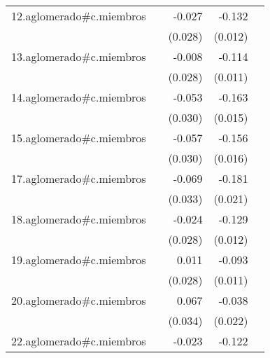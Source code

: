 {\begin{longtable}{l*{4}{D{.}{.}{-1}}}
\addlinespace
12.aglomerado#c.miembros&                     &      -0.027         &      -0.132\sym{***}&                     \\
            &                     &     (0.028)         &     (0.012)         &                     \\
\addlinespace
13.aglomerado#c.miembros&                     &      -0.008         &      -0.114\sym{***}&                     \\
            &                     &     (0.028)         &     (0.011)         &                     \\
\addlinespace
14.aglomerado#c.miembros&                     &      -0.053         &      -0.163\sym{***}&                     \\
            &                     &     (0.030)         &     (0.015)         &                     \\
\addlinespace
15.aglomerado#c.miembros&                     &      -0.057         &      -0.156\sym{***}&                     \\
            &                     &     (0.030)         &     (0.016)         &                     \\
\addlinespace
17.aglomerado#c.miembros&                     &      -0.069\sym{*}  &      -0.181\sym{***}&                     \\
            &                     &     (0.033)         &     (0.021)         &                     \\
\addlinespace
18.aglomerado#c.miembros&                     &      -0.024         &      -0.129\sym{***}&                     \\
            &                     &     (0.028)         &     (0.012)         &                     \\
\addlinespace
19.aglomerado#c.miembros&                     &       0.011         &      -0.093\sym{***}&                     \\
            &                     &     (0.028)         &     (0.011)         &                     \\
\addlinespace
20.aglomerado#c.miembros&                     &       0.067\sym{*}  &      -0.038         &                     \\
            &                     &     (0.034)         &     (0.022)         &                     \\
\addlinespace
22.aglomerado#c.miembros&                     &      -0.023         &      -0.122\sym{***}&                     \\

\end{longtable}}
